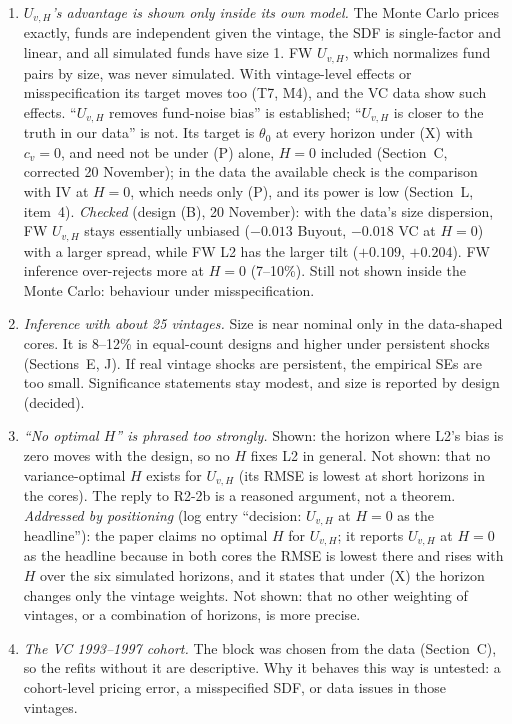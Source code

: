\documentclass[11pt]{article}
\begin{document}
\begin{enumerate}
\item \emph{$U_{v,H}$'s advantage is shown only inside its own model.} The Monte Carlo prices exactly, funds are independent given the vintage, the SDF is single-factor and linear, and all simulated funds have size 1. FW $U_{v,H}$, which normalizes fund pairs by size, was never simulated. With vintage-level effects or misspecification its target moves too (T7, M4), and the VC data show such effects. ``$U_{v,H}$ removes fund-noise bias'' is established; ``$U_{v,H}$ is closer to the truth in our data'' is not. Its target is $\theta_0$ at every horizon under (X) with $c_v=0$, and need not be under (P) alone, $H=0$ included (Section~C, corrected 20 November); in the data the available check is the comparison with IV at $H=0$, which needs only (P), and its power is low (Section~L, item~4). \emph{Checked} (design (B), 20 November): with the data's size dispersion, FW $U_{v,H}$ stays essentially unbiased ($-0.013$ Buyout, $-0.018$ VC at $H=0$) with a larger spread, while FW L2 has the larger tilt ($+0.109$, $+0.204$). FW inference over-rejects more at $H=0$ (7--10\%). Still not shown inside the Monte Carlo: behaviour under misspecification.
\item \emph{Inference with about 25 vintages.} Size is near nominal only in the data-shaped cores. It is 8--12\% in equal-count designs and higher under persistent shocks (Sections~E, J). If real vintage shocks are persistent, the empirical SEs are too small. Significance statements stay modest, and size is reported by design (decided).
\item \emph{``No optimal $H$'' is phrased too strongly.} Shown: the horizon where L2's bias is zero moves with the design, so no $H$ fixes L2 in general. Not shown: that no variance-optimal $H$ exists for $U_{v,H}$ (its RMSE is lowest at short horizons in the cores). The reply to R2-2b is a reasoned argument, not a theorem. \emph{Addressed by positioning} (log entry ``decision: $U_{v,H}$ at $H=0$ as the headline''): the paper claims no optimal $H$ for $U_{v,H}$; it reports $U_{v,H}$ at $H=0$ as the headline because in both cores the RMSE is lowest there and rises with $H$ over the six simulated horizons, and it states that under (X) the horizon changes only the vintage weights. Not shown: that no other weighting of vintages, or a combination of horizons, is more precise.
\item \emph{The VC 1993--1997 cohort.} The block was chosen from the data (Section~C), so the refits without it are descriptive. Why it behaves this way is untested: a cohort-level pricing error, a misspecified SDF, or data issues in those vintages.

\end{enumerate}
\end{document}
